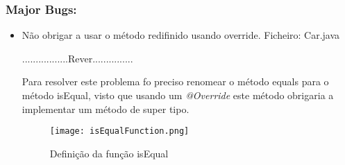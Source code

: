 \subsubsection{Major Bugs:}
\begin{itemize}
\item Não obrigar a usar o método redifinido usando override.\newline
 Ficheiro: Car.java\newline



















.................Rever...............


\par Para resolver este problema fo preciso renomear o método equals para o método isEqual, visto que usando um \textit{@Override} este método obrigaria a implementar um método de super tipo.




























\begin{figure}[H]

  \centering

  \texttt{[image: isEqualFunction.png]}

  \caption {Definição da função isEqual}

  \label {fig07}

\end{figure}

\end{itemize}

